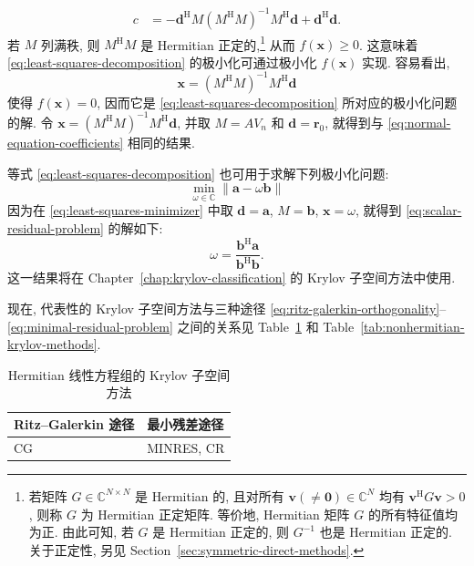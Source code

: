 \begin{Proof}
\[\begin{aligned}
c&=-\bm d^{\mathrm H}M(M^{\mathrm H}M)^{-1}M^{\mathrm H}\bm d+\bm d^{\mathrm H}\bm d.
\end{aligned}
\]
若 $M$ 列满秩, 则 $M^{\mathrm H}M$ 是 Hermitian 正定的,\footnote{若矩阵 $G\in\mathbb C^{N\times N}$ 是 Hermitian 的, 且对所有 $\bm v(\ne\bm 0)\in\mathbb C^N$ 均有 $\bm v^{\mathrm H}G\bm v>0$, 则称 $G$ 为 Hermitian 正定矩阵. 等价地, Hermitian 矩阵 $G$ 的所有特征值均为正. 由此可知, 若 $G$ 是 Hermitian 正定的, 则 $G^{-1}$ 也是 Hermitian 正定的. 关于正定性, 另见 Section~\ref{sec:symmetric-direct-methods}.} 从而 $f(\bm x)\ge0$. 这意味着 \eqref{eq:least-squares-decomposition} 的极小化可通过极小化 $f(\bm x)$ 实现. 容易看出,
\begin{equation}\label{eq:least-squares-minimizer}
\bm x=(M^{\mathrm H}M)^{-1}M^{\mathrm H}\bm d
\end{equation}
使得 $f(\bm x)=0$, 因而它是 \eqref{eq:least-squares-decomposition} 所对应的极小化问题的解.
令 $\bm x=(M^{\mathrm H}M)^{-1}M^{\mathrm H}\bm d$, 并取 $M=AV_n$ 和 $\bm d=\bm r_0$, 就得到与 \eqref{eq:normal-equation-coefficients} 相同的结果.
\end{Proof}

\begin{Remark}\label{rem:scalar-residual-minimization}
等式 \eqref{eq:least-squares-decomposition} 也可用于求解下列极小化问题:
\begin{equation}\label{eq:scalar-residual-problem}
\min_{\omega\in\mathbb C}\|\bm a-\omega\bm b\|
\end{equation}
因为在 \eqref{eq:least-squares-minimizer} 中取 $\bm d=\bm a$, $M=\bm b$, $\bm x=\omega$, 就得到 \eqref{eq:scalar-residual-problem} 的解如下:
\begin{equation}\label{eq:scalar-residual-minimizer}
\omega=\frac{\bm b^{\mathrm H}\bm a}{\bm b^{\mathrm H}\bm b}.
\end{equation}
这一结果将在 Chapter~\ref{chap:krylov-classification} 的 Krylov 子空间方法中使用.
\end{Remark}

现在, 代表性的 Krylov 子空间方法与三种途径 \eqref{eq:ritz-galerkin-orthogonality}--\eqref{eq:minimal-residual-problem} 之间的关系见 Table~\ref{tab:hermitian-krylov-methods} 和 Table~\ref{tab:nonhermitian-krylov-methods}.

\begin{table}[H]
\centering
\caption{Hermitian 线性方程组的 Krylov 子空间方法}\label{tab:hermitian-krylov-methods}
\begin{tabular}{ll}\hline
Ritz--Galerkin 途径 & 最小残差途径\\\hline
CG & MINRES, CR\\\hline
\end{tabular}
\end{table}

